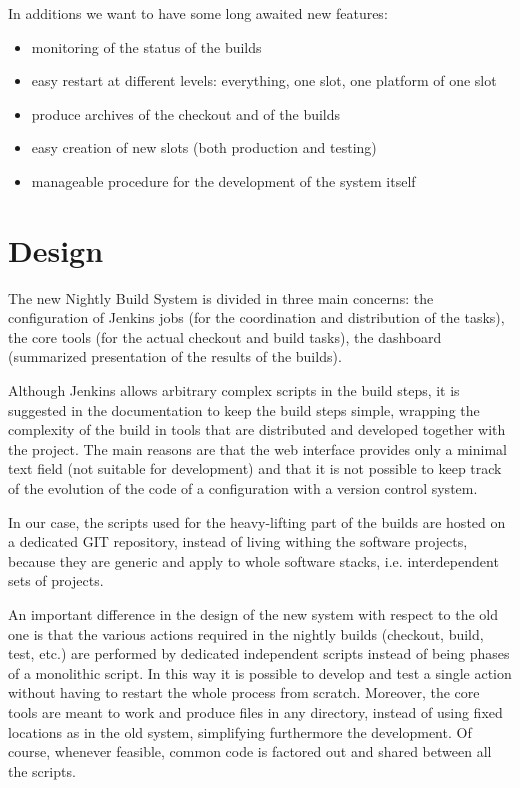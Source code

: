 \documentclass{lhcbnote}
\begin{document}
In additions we want to have some long awaited new features:
\begin{itemize}
  \item monitoring of the status of the builds
  \item easy restart at different levels: everything, one slot, one platform of
one slot
  \item produce archives of the checkout and of the builds
  \item easy creation of new slots (both production and testing)
  \item manageable procedure for the development of the system itself
\end{itemize}

\section{Design}
The new Nightly Build System is divided in three main concerns: the
configuration of Jenkins jobs (for the coordination and distribution of the
tasks), the core tools (for the actual checkout and build tasks), the dashboard
(summarized presentation of the results of the builds).

Although Jenkins allows arbitrary complex scripts in the build steps, it is
suggested in the documentation to keep the build steps simple, wrapping the
complexity of the build in tools that are distributed and developed together
with the project.  The main reasons are that the web interface provides only a
minimal text field (not suitable for development) and that it is not possible to
keep track of the evolution of the code of a configuration with a version
control system.

In our case, the scripts used for the heavy-lifting part of the builds are
hosted on a dedicated GIT\cite{GIT} repository, instead of living withing the
software projects, because they are generic and apply to whole software stacks,
i.e. interdependent sets of projects.

An important difference in the design of the new system with respect to the old
one is that the various actions required in the nightly builds (checkout, build,
test, etc.) are performed by dedicated independent scripts instead of being
phases of a monolithic script.  In this way it is possible to develop and test a
single action without having to restart the whole process from scratch.
Moreover, the core tools are meant to work and produce files in any directory,
instead of using fixed locations as in the old system, simplifying furthermore
the development. Of course, whenever feasible, common code is factored out and
shared between all the scripts.
\end{document}
